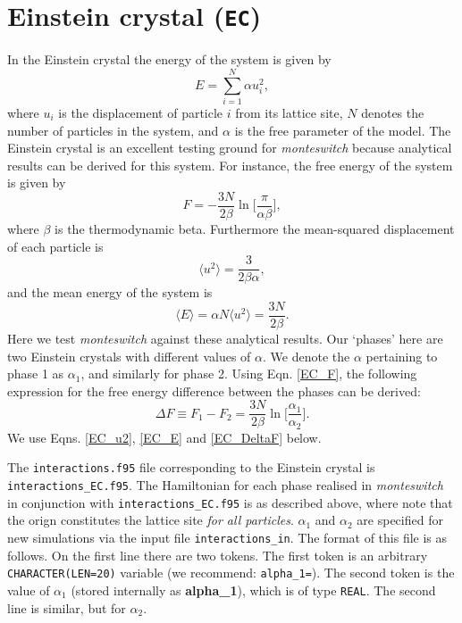 \documentclass{report}
\begin{document}
\section{Einstein crystal (\texttt{EC})}
In the Einstein crystal the energy of the system is given by
\begin{equation}
E=\sum_{i=1}^N\alpha u_i^2,
\end{equation}
where $u_i$ is the displacement of particle $i$ from its lattice site, $N$ denotes the number of particles in the system, and $\alpha$
is the free parameter of the model. The Einstein crystal is an excellent testing ground for \emph{monteswitch} because 
analytical results can be derived for this system. For instance, the free energy of the system is given by \cite{book:Frenkel}
\begin{equation}\label{EC_F}
F=-\frac{3N}{2\beta}\ln\biggl[\frac{\pi}{\alpha\beta}\biggr],
\end{equation}
where $\beta$ is the thermodynamic beta. Furthermore the mean-squared displacement of each particle is \cite{book:Frenkel}
\begin{equation}\label{EC_u2}
\langle u^2\rangle = \frac{3}{2\beta\alpha},
\end{equation}
and the mean energy of the system is
\begin{equation}\label{EC_E}
\langle E\rangle=\alpha N\langle u^2\rangle = \frac{3N}{2\beta}.
\end{equation}
Here we test \emph{monteswitch} against these analytical results. Our `phases' here are two Einstein crystals with different values
of $\alpha$. We denote the $\alpha$ pertaining to phase 1 as $\alpha_1$, and similarly for phase 2. Using Eqn. \eqref{EC_F},
the following expression for the free energy difference between the phases can be derived:
\begin{equation}\label{EC_DeltaF}
\Delta F\equiv F_1-F_2=\frac{3N}{2\beta}\ln\biggr[\frac{\alpha_1}{\alpha_2}\biggr].
\end{equation}
We use Eqns. \eqref{EC_u2}, \eqref{EC_E} and \eqref{EC_DeltaF} below.

The \texttt{interactions.f95} file corresponding to the Einstein crystal is \texttt{interactions\_EC.f95}. The Hamiltonian for 
each phase realised in \emph{monteswitch} in conjunction with \texttt{interactions\_EC.f95} is as described above, where 
note that the orign constitutes the lattice site \emph{for all particles}.
$\alpha_1$ and $\alpha_2$ are specified for new simulations via the input file \texttt{interactions\_in}. 
The format of this file is as follows. On the first line there are two tokens. The first token is an arbitrary \texttt{CHARACTER(LEN=20)} 
variable (we recommend: \texttt{alpha\_1=}). The second token is the value of $\alpha_1$ (stored internally as 
\textbf{alpha\_1}), which is of type \texttt{REAL}. The second line is similar, but for $\alpha_2$.
\end{document}
